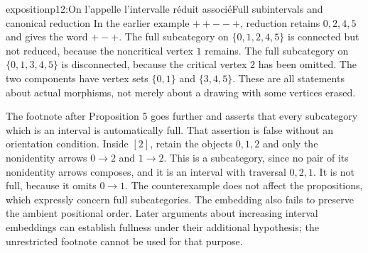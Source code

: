 \begin{dcomment}{exposition}{p12:On l'appelle l'intervalle réduit associé}{Full subintervals and canonical reduction}
In the earlier example $++--+$, reduction retains $0,2,4,5$ and gives the word $+-+$. The full subcategory on $\{0,1,2,4,5\}$ is connected but not reduced, because the noncritical vertex $1$ remains. The full subcategory on $\{0,1,3,4,5\}$ is disconnected, because the critical vertex $2$ has been omitted. The two components have vertex sets $\{0,1\}$ and $\{3,4,5\}$. These are all statements about actual morphisms, not merely about a drawing with some vertices erased.

The footnote after Proposition 5 goes further and asserts that every subcategory which is an interval is automatically full. That assertion is false without an orientation condition. Inside $[2]$, retain the objects $0,1,2$ and only the nonidentity arrows $0\to2$ and $1\to2$. This is a subcategory, since no pair of its nonidentity arrows composes, and it is an interval with traversal $0,2,1$. It is not full, because it omits $0\to1$. The counterexample does not affect the propositions, which expressly concern full subcategories. The embedding also fails to preserve the ambient positional order. Later arguments about increasing interval embeddings can establish fullness under their additional hypothesis; the unrestricted footnote cannot be used for that purpose.
\end{dcomment}

